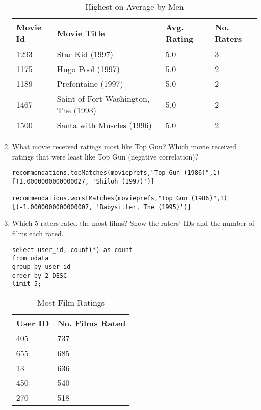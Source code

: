\documentclass[letterpaper,11pt]{report}
\begin{document}
\begin{savenotes}
\begin{enumerate}
\begin{table}[htbp]
\centering
    \begin{tabular}{|l|l|l|l|}
    \hline
    Movie Id & Movie Title                          & Avg. Rating & No. Raters \\ \hline
    1293     & Star Kid (1997)                      & 5.0         & 3          \\ \hline
    1175     & Hugo Pool (1997)                     & 5.0         & 2          \\ \hline
    1189     & Prefontaine (1997)                   & 5.0         & 2          \\ \hline
    1467     & Saint of Fort Washington, The (1993) & 5.0         & 2          \\ \hline
    1500     & Santa with Muscles (1996)            & 5.0         & 2          \\ \hline
    \end{tabular}
    \caption {Highest on Average by Men}
				\label{tab:HighMen}
\end{table}

\item What movie received ratings most like Top Gun? Which movie received ratings that were least like Top Gun (negative correlation)?

\begin{verbatim}
recommendations.topMatches(movieprefs,"Top Gun (1986)",1)
[(1.0000000000000027, 'Shiloh (1997)')]

recommendations.worstMatches(movieprefs,"Top Gun (1986)",1)
[(-1.0000000000000007, 'Babysitter, The (1995)')]
\end{verbatim}

\item Which 5 raters rated the most films? Show the raters' IDs and the number of films each rated.
\begin{verbatim}
select user_id, count(*) as count 
from udata 
group by user_id 
order by 2 DESC 
limit 5;
\end{verbatim}

\begin{table}[htbp]
\centering
    \begin{tabular}{|l|l|}
    \hline
    User ID & No. Films Rated \\ \hline
    405     & 737             \\ \hline
    655     & 685             \\ \hline
    13      & 636             \\ \hline
    450     & 540             \\ \hline
    270     & 518             \\ \hline
    \end{tabular}
    \caption {Most Film Ratings}
\end{table}


\end{enumerate}
\end{savenotes}
\end{document}
